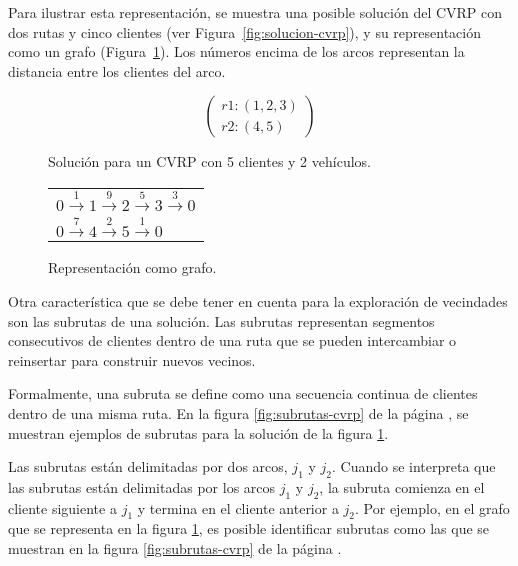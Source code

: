 \documentclass[12pt]{report}
\begin{document}
	Para ilustrar esta representación, se muestra una posible solución del CVRP con dos rutas y cinco clientes (ver Figura~\ref{fig:solucion-cvrp}), y su representación como un grafo (Figura~\ref{fig:grafo-cvrp}). Los números encima de los arcos representan la distancia entre los clientes del arco.

	\begin{figure}[h!]
		\begin{minipage}{0.45\textwidth}
			\centering
			\[
			\left(
			\begin{array}{l}
				r1: (1,2,3) \\
				r2: (4,5)
			\end{array}
			\right)
			\]
			\caption{Solución para un CVRP con 5 clientes y 2 vehículos.}
			\label{fig:solucion-cvrp}
		\end{minipage}
		\hfill
		\begin{minipage}{0.45\textwidth}
			\centering
			\begin{tabular}{l}
				$0 \overset{1}{\rightarrow}1 \overset{9}{\rightarrow}2 \overset{5}{\rightarrow}3 \overset{3}{\rightarrow}0$\\
				$0 \overset{7}{\rightarrow}4 \overset{2}{\rightarrow}5 \overset{1}{\rightarrow}0$
			\end{tabular}
			\caption{Representación como grafo.}
			\label{fig:grafo-cvrp}
		\end{minipage}
	\end{figure}

	Otra característica que se debe tener en cuenta para la exploración de vecindades son las subrutas de una solución. Las subrutas representan segmentos consecutivos de clientes dentro de una ruta que se pueden intercambiar o reinsertar para construir nuevos vecinos.

	Formalmente, una subruta se define como una secuencia continua de clientes dentro de una misma ruta. En la figura \ref{fig:subrutas-cvrp} de la página \pageref{fig:subrutas-cvrp}, se muestran ejemplos de subrutas para la solución de la figura \ref{fig:grafo-cvrp}.

	Las subrutas están delimitadas por dos arcos, $j_1$ y $j_2$. Cuando se interpreta que las subrutas están delimitadas por los arcos $j_1$ y $j_2$, la subruta comienza en el cliente siguiente a $j_1$ y termina en el cliente anterior a $j_2$. Por ejemplo, en el grafo que se representa en la figura \ref{fig:grafo-cvrp}, es posible identificar subrutas como las que se muestran en la figura \ref{fig:subrutas-cvrp} de la página \pageref{fig:subrutas-cvrp}.
\end{document}
